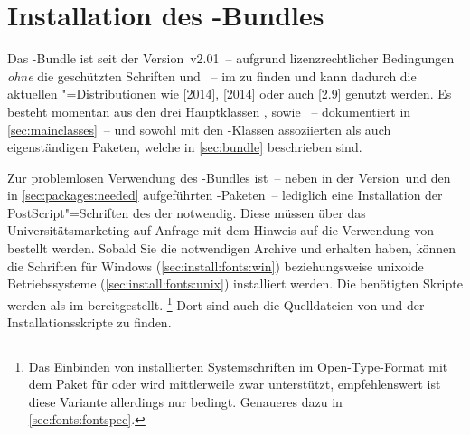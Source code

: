 \section{Installation des \TUDScript-Bundles}
\label{sec:install}%
%
%
%
Das \TUDScript-Bundle ist seit der Version~v2.01~-- aufgrund lizenzrechtlicher 
Bedingungen \emph{ohne} die geschützten Schriften \Univers und \DIN~-- im 
\foreignlanguage{english}{%
} zu finden und kann dadurch die aktuellen "=Distributionen wie 
[2014], [2014] 
oder auch [2.9] genutzt werden. Es besteht 
momentan aus den drei Hauptklassen ,  
sowie ~-- dokumentiert in \autoref{sec:mainclasses}~-- und 
sowohl mit den \TUDScript-Klassen assoziierten als auch eigenständigen Paketen, 
welche in \autoref{sec:bundle} beschrieben sind.

Zur problemlosen Verwendung des \TUDScript-Bundles ist~-- neben \KOMAScript{} in
der Version~\vKOMAScript und den in \autoref{sec:packages:needed} aufgeführten 
-Paketen~-- lediglich eine Installation der PostScript"=Schriften 
des \CDs der \TnUD notwendig. Diese müssen über das Universitätsmarketing auf 
%
{Anfrage} mit dem Hinweis auf die Verwendung von  bestellt 
werden. Sobald Sie die notwendigen Archive  und 
 erhalten haben, können die Schriften für Windows 
(\autoref{sec:install:fonts:win}) beziehungsweise unixoide Betriebssysteme 
(\autoref{sec:install:fonts:unix}) installiert werden. Die benötigten Skripte 
werden als  
im \GitHubRepo* bereitgestellt.%
\footnote{%
  Das Einbinden von installierten Systemschriften im Open-Type-Format mit dem 
  Paket  für  oder  wird 
  mittlerweile zwar unterstützt, empfehlenswert ist diese Variante allerdings 
  nur bedingt. Genaueres dazu in \autoref{sec:fonts:fontspec}.%
}
Dort sind auch die Quelldateien von \TUDScript und der Installationsskripte zu 
finden.


